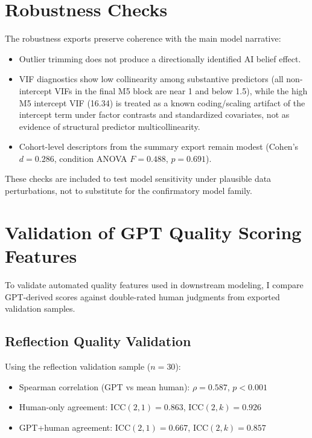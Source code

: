 \pagebreak
\section{Robustness Checks}

The robustness exports preserve coherence with the main model narrative:
\begin{itemize}
    \item Outlier trimming does not produce a directionally identified AI belief effect.
    \item VIF diagnostics show low collinearity among substantive predictors
    (all non-intercept VIFs in the final M5 block are near 1 and below 1.5), while the
    high M5 intercept VIF (16.34) is treated as a known coding/scaling artifact of the intercept
    term under factor contrasts and standardized covariates, not as evidence of structural predictor
    multicollinearity.
    \item Cohort-level descriptors from the summary export remain modest (Cohen's $d=0.286$, condition ANOVA $F=0.488$, $p=0.691$).
\end{itemize}

These checks are included to test model sensitivity under plausible data perturbations,
not to substitute for the confirmatory model family.

\pagebreak
\section{Validation of GPT Quality Scoring Features}

To validate automated quality features used in downstream modeling,
I compare GPT-derived scores against double-rated human judgments
from exported validation samples.

\subsection{Reflection Quality Validation}

Using the reflection validation sample ($n=30$):
\begin{itemize}
    \item Spearman correlation (GPT vs mean human): $\rho=0.587$, $p<0.001$
    \item Human-only agreement: ICC$(2,1)=0.863$, ICC$(2,k)=0.926$
    \item GPT+human agreement: ICC$(2,1)=0.667$, ICC$(2,k)=0.857$
\end{itemize}

